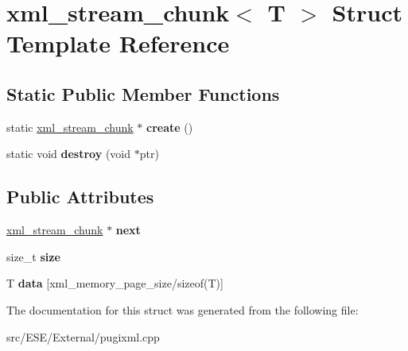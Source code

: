 \hypertarget{structxml__stream__chunk}{\section{xml\-\_\-stream\-\_\-chunk$<$ T $>$ Struct Template Reference}
\label{structxml__stream__chunk}
}
\subsection*{Static Public Member Functions}
\begin{DoxyCompactItemize}
\item 
\hypertarget{structxml__stream__chunk_a92cffe33c529ff266329fd4afb59226d}{static \hyperlink{structxml__stream__chunk}{xml\-\_\-stream\-\_\-chunk} $\ast$ {\bfseries create} ()}\label{structxml__stream__chunk_a92cffe33c529ff266329fd4afb59226d}

\item 
\hypertarget{structxml__stream__chunk_a4b812901d59950d48d539e5c8726a0e8}{static void {\bfseries destroy} (void $\ast$ptr)}\label{structxml__stream__chunk_a4b812901d59950d48d539e5c8726a0e8}

\end{DoxyCompactItemize}
\subsection*{Public Attributes}
\begin{DoxyCompactItemize}
\item 
\hypertarget{structxml__stream__chunk_ad00071f7340adb2bde7c4157d4100b3c}{\hyperlink{structxml__stream__chunk}{xml\-\_\-stream\-\_\-chunk} $\ast$ {\bfseries next}}\label{structxml__stream__chunk_ad00071f7340adb2bde7c4157d4100b3c}

\item 
\hypertarget{structxml__stream__chunk_a42618ba3b7bda1246cfc640149fc34eb}{size\-\_\-t {\bfseries size}}\label{structxml__stream__chunk_a42618ba3b7bda1246cfc640149fc34eb}

\item 
\hypertarget{structxml__stream__chunk_a365e2e228a0277467b25a0fea42b8518}{T {\bfseries data} \mbox{[}xml\-\_\-memory\-\_\-page\-\_\-size/sizeof(T)\mbox{]}}\label{structxml__stream__chunk_a365e2e228a0277467b25a0fea42b8518}

\end{DoxyCompactItemize}


The documentation for this struct was generated from the following file\-:\begin{DoxyCompactItemize}
\item 
src/\-E\-S\-E/\-External/pugixml.\-cpp\end{DoxyCompactItemize}
